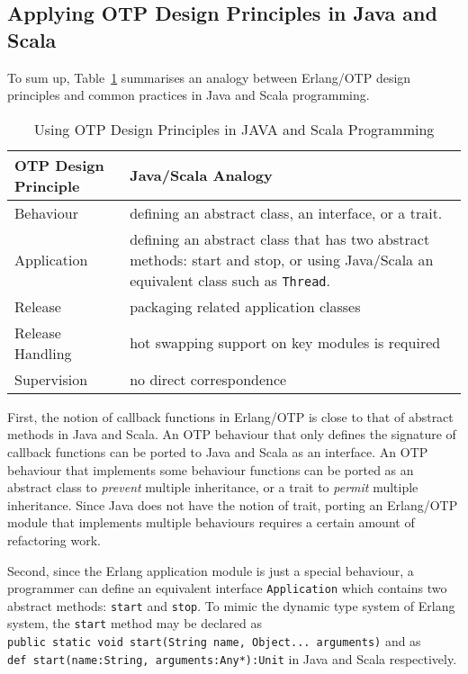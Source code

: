\subsection{Applying OTP Design Principles in Java and Scala}

To sum up, Table~\ref{otp} summarises an analogy between Erlang/OTP 
design principles and common practices in Java and Scala programming.  

\begin{table}[h]
\begin{tabular}{| l | p{10 cm} | }
\hline
  OTP Design Principle & Java/Scala Analogy \\
\hline
  Behaviour & defining an abstract class, an interface, or a trait. \\
\hline
  Application  & defining an abstract class that has two abstract methods: start 
and stop, or using Java/Scala an equivalent class such as {\tt Thread}. \\
\hline
  Release  & packaging related application classes  \\ 
\hline
  Release Handling  & hot swapping support on key modules is required \\
\hline
  Supervision  & no direct correspondence  \\
\hline
\end{tabular}
 \caption[]{Using OTP Design Principles in JAVA and Scala Programming}
\label{otp}
\end{table}

First, the notion of callback functions in Erlang/OTP is close to that
of abstract methods in Java and Scala.  An OTP behaviour that only defines the 
signature of callback functions can be ported to Java and Scala as an interface. 
 An OTP behaviour that implements some behaviour functions can be ported as an 
abstract class to {\it prevent} multiple inheritance, or a trait to {\it permit} 
multiple inheritance.  Since Java does not have the notion of trait, porting an 
Erlang/OTP module that implements multiple behaviours requires a certain amount 
of refactoring work.

Second, since the Erlang application module is just a special behaviour, a 
programmer can 
define an equivalent interface {\tt Application} which contains two abstract 
methods: {\tt start} and {\tt stop}.  To mimic the dynamic type system of Erlang 
system, the {\tt start} method may be declared as \\ 
{\tt public static void start(String name, Object... arguments)}
and as \\  
{\tt def start(name:String, arguments:Any*):Unit} in Java and Scala 
respectively. 

